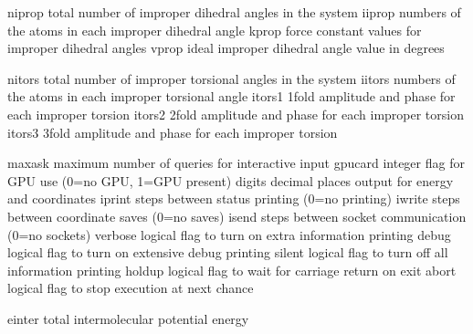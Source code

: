 \documentclass[letterpaper,11pt,english]{sphinxmanual}
\begin{document}
\sphinxAtStartPar
{}

\begin{sphinxVerbatim}[commandchars=\\\{\}]
niprop          total number of improper dihedral angles in the system
iiprop          numbers of the atoms in each improper dihedral angle
kprop           force constant values for improper dihedral angles
vprop           ideal improper dihedral angle value in degrees
\end{sphinxVerbatim}

\sphinxAtStartPar
{}

\begin{sphinxVerbatim}[commandchars=\\\{\}]
nitors          total number of improper torsional angles in the system
iitors          numbers of the atoms in each improper torsional angle
itors1          1\PYGZhy{}fold amplitude and phase for each improper torsion
itors2          2\PYGZhy{}fold amplitude and phase for each improper torsion
itors3          3\PYGZhy{}fold amplitude and phase for each improper torsion
\end{sphinxVerbatim}

\sphinxAtStartPar
{}

\begin{sphinxVerbatim}[commandchars=\\\{\}]
maxask          maximum number of queries for interactive input
gpucard         integer flag for GPU use (0=no GPU, 1=GPU present)
digits          decimal places output for energy and coordinates
iprint          steps between status printing (0=no printing)
iwrite          steps between coordinate saves (0=no saves)
isend           steps between socket communication (0=no sockets)
verbose         logical flag to turn on extra information printing
debug           logical flag to turn on extensive debug printing
silent          logical flag to turn off all information printing
holdup          logical flag to wait for carriage return on exit
abort           logical flag to stop execution at next chance
\end{sphinxVerbatim}

\sphinxAtStartPar
{}

\begin{sphinxVerbatim}[commandchars=\\\{\}]
einter          total intermolecular potential energy
\end{sphinxVerbatim}
\end{document}
